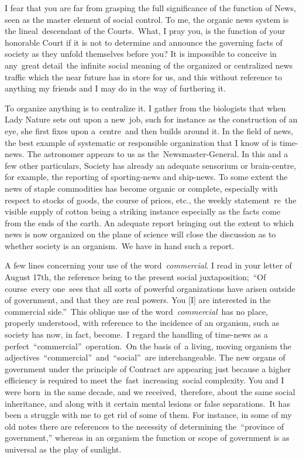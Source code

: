 \documentclass[twoside,symmetric,nobib,justified]{tufte-book}
\begin{document}
I fear that you are far from grasping the full significance of the
function of News, seen as the master element of social control. To me,
the organic news system is the lineal~descendant of the Courts.~What, I
pray you, is the function of your honorable Court if it is not to
determine and announce the governing facts of society as they unfold
themselves before you? It is impossible to conceive in any~great
detail~the infinite social meaning of the organized or centralized news
traffic which the near future has in store for us, and this without
reference to anything my friends and I may do in the way of furthering
it.~

To organize anything is to centralize it. I gather from the biologists
that when Lady Nature sets out upon a new~job, such for instance as the
construction of an eye, she first fixes upon a~centre~and then builds
around it. In the field of news, the best example of systematic or
responsible organization that I know of is time-news. The astronomer
appears to us as the~Newsmaster-General. In this and a few other
particulars, Society has already an adequate sensorium or brain-centre,
for example, the reporting of sporting-news and ship-news. To some
extent the news of staple commodities has become organic or complete,
especially with respect to stocks of goods, the course of prices, etc.,
the weekly statement~re~the visible supply of cotton being a striking
instance especially as the facts come from the ends of the earth. An
adequate report bringing out the extent to which news is now organized
on the plane of science will close the discussion as to whether society
is an organism.~We have in hand such a report.~

A few lines concerning your use of the word~\emph{commercial}. I read in
your letter of August 17th, the reference being to the present social
juxtaposition;~``Of course~every one~sees that all sorts of powerful
organizations have arisen outside of government, and that they are real
powers. You {[}I{]} are interested in the commercial side.''~This
oblique use of the word~\emph{commercial}~has no place, properly
understood, with reference to the incidence of an organism, such as
society has now, in fact, become.~I regard the handling of time-news as
a perfect~``commercial''~operation.~On the basis of~a living, moving
organism the adjectives~``commercial''~and~``social''~are
interchangeable. The new organs of government under the principle of
Contract are appearing just because a higher efficiency is required to
meet the~fast~increasing~social complexity. You and I were born~in the
same decade, and we received,~therefore, about the same social
inheritance, and along with it certain mental lesions or false
separations.~It has been a struggle with me to get rid of some of them.
For instance, in some of my old notes there are references to the
necessity of determining the~``province of government,'' whereas in an
organism the function or scope of government is as universal as the play
of sunlight.~
\end{document}
